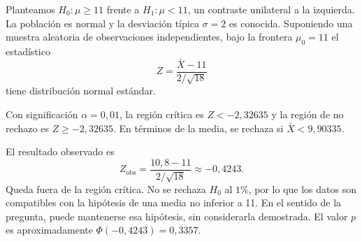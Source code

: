 Planteamos $H_0:\mu\ge11$ frente a $H_1:\mu<11$, un contraste unilateral a la izquierda. La población es normal y la desviación típica $\sigma=2$ es conocida. Suponiendo una muestra aleatoria de observaciones independientes, bajo la frontera $\mu_0=11$ el estadístico
\[
 Z=\frac{\bar X-11}{2/\sqrt{18}}
\]
tiene distribución normal estándar.

Con significación $\alpha=0{,}01$, la región crítica es $Z<-2{,}32635$ y la región de no rechazo es $Z\ge-2{,}32635$. En términos de la media, se rechaza si $\bar X<9{,}90335$.

El resultado observado es
\[
 Z_{\mathrm{obs}}=\frac{10{,}8-11}{2/\sqrt{18}}\approx-0{,}4243.
\]
Queda fuera de la región crítica. No se rechaza $H_0$ al $1\%$, por lo que los datos son compatibles con la hipótesis de una media no inferior a 11. En el sentido de la pregunta, puede mantenerse esa hipótesis, sin considerarla demostrada. El valor $p$ es aproximadamente $\Phi(-0{,}4243)=0{,}3357$.
